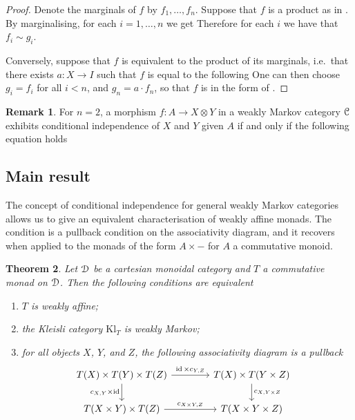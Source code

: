 \documentclass[a4paper,UKenglish,numberwithinsect,cleveref, autoref, thm-restate]{lipics-v2021}
\theoremstyle{plain} %
\newtheorem{mytheorem}{Theorem}[section]
\theoremstyle{definition} %
\newtheorem{myremark}[mytheorem]{Remark}
\begin{document}
\begin{proof}
 Denote the marginals of $f$ by $f_1,\dots,f_n$.
 Suppose that $f$ is a product as in . By marginalising, for each $i=1,\dots,n$ we get
 Therefore for each $i$ we have that $f_i\sim g_i$. 
 
 Conversely, suppose that $f$ is equivalent to the product of its marginals, i.e.~that there exists $a:X\to I$ such that $f$ is equal to the following
 One can then choose $g_i=f_i$ for all $i<n$, and $g_n = a\cdot f_n$, so that $f$ is in the form of .
\end{proof} 
 
\begin{myremark}
 For $n=2$, a morphism $f:A\to X\otimes Y$ in a weakly Markov category $\mathcal{C}$ exhibits conditional independence of $X$ and $Y$ given $A$ 
 if and only if the following equation holds
\end{myremark}


\subsection{Main result}

The concept of conditional independence for general weakly Markov categories allows us to give an equivalent characterisation of weakly affine monads.
The condition is a pullback condition on the associativity diagram, and it recovers  when applied to the monads of the form $A \times -$ for $A$ a commutative monoid.

\begin{mytheorem}\label{mainthm}
 Let $\mathcal{D}$ be a cartesian monoidal category and $T$ a commutative monad on $\mathcal{D}$.
 Then the following conditions are equivalent
 \begin{enumerate}
  \item\label{condgroup} $T$ is weakly affine;
  \item\label{condwm} the Kleisli category $\mathrm{Kl}_T$ is weakly Markov;
  \item\label{condpullback} for all objects $X$, $Y$, and $Z$, the following associativity diagram is a pullback
	\begin{equation}
		\label{assoc_pullback}
		\hspace{-9pt}	%
		\begin{tikzcd}[column sep=3.3pc]
			T(X) \times T(Y) \times T(Z) \ar{r}{\id \times c_{Y,Z}} \ar[swap]{d}{c_{X,Y} \times \id}	& T(X) \times T(Y \times Z) \ar{d}{c_{X,Y \times Z}}	\\
			T(X \times Y) \times T(Z) \ar{r}{c_{X\times Y,Z}}						& T(X \times Y \times Z)
		\end{tikzcd}
	\end{equation}
 \end{enumerate}
\end{mytheorem}
\end{document}
